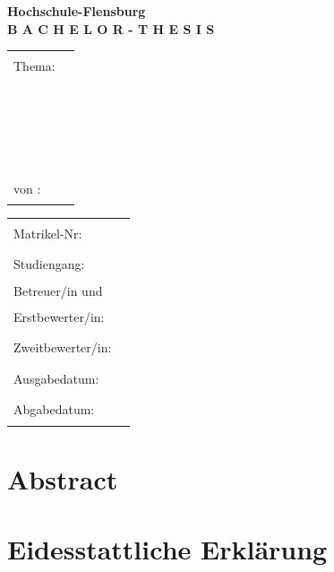 \documentclass[a4paper, 10pt, DIV=13, BCOR=8mm]{scrbook}
\begin{document}
\begin{titlepage}
  \begin{center}
    \Large \textbf{Hochschule-Flensburg}
    \\[2\normalbaselineskip]
    \Huge \textbf{B A C H E L O R - T H E S I S}
  \end{center}

	\begin{tabular}{@{}p{2.5cm}@{} @{}p{12cm}@{}}
    \\[4\normalbaselineskip]
    \large Thema: & \hrule
    \\[2\normalbaselineskip]
    & \hrule
    \\[2\normalbaselineskip]
    & \hrule
    \\[2\normalbaselineskip]
    & \hrule
    \\[3\normalbaselineskip]
    \large von : & \hrule
  \end{tabular}\hspace{2ex}

  \begin{tabular}{@{}p{3.5cm}@{} @{}p{7.5cm}@{}}
    \\[4\normalbaselineskip]
    \large Matrikel-Nr: & \hrule
    \\[1.5\normalbaselineskip]
    \large Studiengang: & \hrule
    \\[1.5\normalbaselineskip]
    \large Betreuer/in und \\
    \large Erstbewerter/in: & \hrule
    \\[1.5\normalbaselineskip]
    \large Zweitbewerter/in: & \hrule
    \\[1.5\normalbaselineskip]
    \large Ausgabedatum: & \hrule
    \\[1.5\normalbaselineskip]
    \large Abgabedatum: & \hrule
  \end{tabular}
\end{titlepage}

\chapter*{Abstract}

\blindtext



\chapter*{Eidesstattliche Erklärung}
\end{document}

